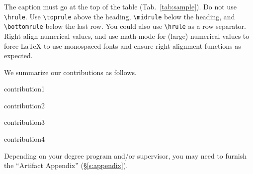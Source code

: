 %
The caption must go at the top of the table (Tab.~\ref{tab:sample}).
%
Do not use \texttt{\textbackslash{}hrule}.
%
Use \texttt{\textbackslash{}toprule} above the heading,
\texttt{\textbackslash{}midrule} below the heading, and
\texttt{\textbackslash{}bottomrule} below the last row.
%
You could also use \texttt{\textbackslash{}hrule} as a row separator.
%
Right align numerical values, and use math-mode for (large) numerical values to
force \LaTeX{} to use monospaced fonts and ensure right-alignment functions as
expected.


We summarize our contributions as follows.

\case{}
%
contribution1

\case{}
% 
contribution2

\case{}
% 
contribution3

\case{}
% 
contribution4

Depending on your degree program and/or supervisor, you may need to furnish the
“Artifact Appendix” (\S\ref{s:appendix}).


